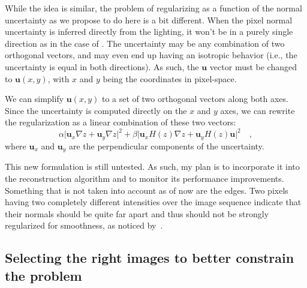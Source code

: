While the idea is similar, the problem of regularizing as a function of the normal uncertainty as we propose to do here is a bit different. When the pixel normal uncertainty is inferred directly from the lighting, it won't be in a purely single direction as in the case of \cite{hernandez-pami-11}. The uncertainty may be any combination of two orthogonal vectors, and may even end up having an isotropic behavior (i.e., the uncertainty is equal in both directions). As such, the $\mathbf{u}$ vector must be changed to $\mathbf{u}(x,y)$, with $x$ and $y$ being the coordinates in pixel-space.

We can simplify $\mathbf{u}(x,y)$ to a set of two orthogonal vectors along both axes. Since the uncertainty is computed directly on the $x$ and $y$ axes, we can rewrite the regularization as a linear combination of these two vectors:
\begin{equation}
\alpha \lvert \mathbf{u}_x \nabla z + \mathbf{u}_y \nabla z\rvert ^2 +
\beta \lvert \mathbf{u}_x H(z)\nabla z + \mathbf{u}_y H(z) \mathbf{u}\rvert ^2
\quad,
\end{equation}
where $\mathbf{u}_x$ and $\mathbf{u}_y$ are the perpendicular components of the uncertainty.

This new formulation is still untested. As such, my plan is to incorporate it into the reconstruction algorithm and to monitor its performance improvements. Something that is not taken into account as of now are the edges. Two pixels having two completely different intensities over the image sequence indicate that their normals should be quite far apart and thus should not be strongly regularized for smoothness, as noticed by~\cite{jung-cvpr-15}.


\subsection{Selecting the right images to better constrain the problem}
\label{subsec:selection}


